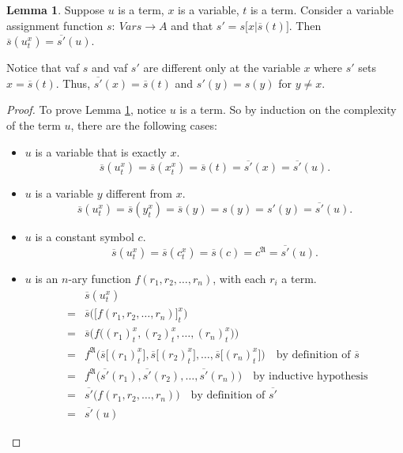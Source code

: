 \documentclass[11pt,letterpaper]{book}
\theoremstyle{definition}
\newtheorem{lemma}{Lemma}[section]
\begin{document}
\begin{lemma}\label{lemma:tech_lemma_1}
Suppose $u$ is a term, $x$ is a variable, $t$ is a term. Consider a
variable assignment function $s: \ Vars \rightarrow A$ and that $s' =
s\big[ x | \overline{s} (t) \big]$. Then $\overline{s}(u_t ^x) =
\overline{s'} (u)$.
\end{lemma}

Notice that vaf $s$ and vaf $s'$ are different only at the variable $x$
where $s'$ sets $x = \overline{s} (t)$. Thus, $\overline{s'} (x) =
\overline{s} (t)$ and $s' (y) = s(y) $ for $y \neq x$.

\begin{proof}


To prove Lemma \ref{lemma:tech_lemma_1}, notice $u$ is a term. So by
induction on the complexity of the term $u$, there are the following cases:

\begin{itemize}
\item{$u$ is a variable that is exactly $x$.
\begin{equation}
\overline{s}(u_t ^x) = \overline{s}(x_t ^x) = \overline{s} (t) =
\overline{s'} (x) = \overline{s'} (u) . \nonumber
\end{equation}
}
\item{$u$ is a variable $y$ different from $x$.
\begin{equation}
\overline{s}(u_t ^x) = \overline{s}(y_t ^x) = \overline{s} (y) = s(y) =
s'(y) = \overline{s'} (u) . \nonumber
\end{equation}
}
\item{$u$ is a constant symbol $c$.
\begin{equation}
\overline{s}(u_t ^x) = \overline{s}(c_t ^x) = \overline{s} (c) =
c^{\mathfrak{A}} = \overline{s'} (u) .  \nonumber
\end{equation}
}
\item{$u$ is an $n$-ary function $f(r_1, r_2, \ldots, r_n)$, with each
$r_i$ a term.
\begin{eqnarray*}
& &\overline{s}(u_t ^x) \\
&=& \overline{s}\big( \big[ f( r_1, r_2, \ldots, r_n ) \big]_t ^x \big) \\
&=& \overline{s} \big( f\big( (r_1)_t ^x, (r_2)_t ^x, \ldots, (r_n)_t ^x
\big) \big) \\
&=& f^{\mathfrak{A}} \big( \overline{s}\big[ (r_1)_t ^x \big],
\overline{s}\big[ (r_2)_t ^x \big], \ldots, \overline{s}\big[ (r_n)_t ^x
\big]  \big) \quad \text{by definition of } \overline{s} \\
&=& f^{\mathfrak{A}} \big( \overline{s'} (r_1), \overline{s'} (r_2),
\ldots, \overline{s'} (r_n)  \big) \quad \text{by inductive hypothesis } \\
&=& \overline{s'} \big( f(r_1, r_2, \ldots, r_n) \big) \quad \text{by
definition of } \overline{s'} \\
&=& \overline{s'} (u)
\end{eqnarray*}

}
\end{itemize}

\end{proof}
\end{document}
